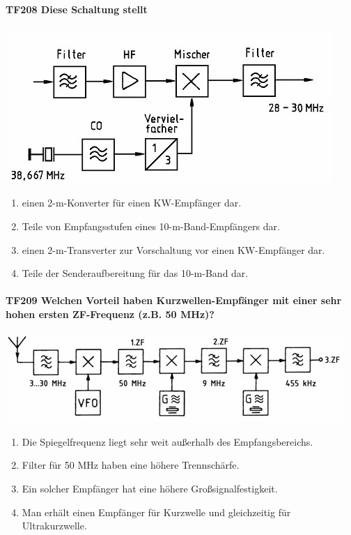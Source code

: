 \documentclass[8pt]{article}
\begin{document}
\begin{enumerate}
\paragraph*{TF208 Diese Schaltung stellt}
\begin{center}
	\begin{minipage}{\linewidth}
		\centering
		\includegraphics[scale=1.0]{pics/tf208_a.jpg}
	\end{minipage}
\end{center}
\begin{enumerate}[nolistsep,label=\Alph*]
\item einen 2-m-Konverter für einen KW-Empfänger dar.
\item Teile von Empfangsstufen eines 10-m-Band-Empfängers dar.
\item einen 2-m-Transverter zur Vorschaltung vor einen KW-Empfänger dar.
\item Teile der Senderaufbereitung für das 10-m-Band dar.
\end{enumerate}

\paragraph*{TF209 Welchen Vorteil haben Kurzwellen-Empfänger mit einer sehr hohen ersten ZF-Frequenz (z.B. 50 MHz)?}
\begin{center}
	\begin{minipage}{\linewidth}
		\centering
		\includegraphics[scale=1.0]{pics/tf209_a.jpg}
	\end{minipage}
\end{center}
\begin{enumerate}[nolistsep,label=\Alph*]
\item Die Spiegelfrequenz liegt sehr weit außerhalb des Empfangsbereichs.
\item Filter für 50 MHz haben eine höhere Trennschärfe. 
\item Ein solcher Empfänger hat eine höhere Großsignalfestigkeit.
\item Man erhält einen Empfänger für Kurzwelle und gleichzeitig für Ultrakurzwelle.
\end{enumerate}


\end{enumerate}
\end{document}
